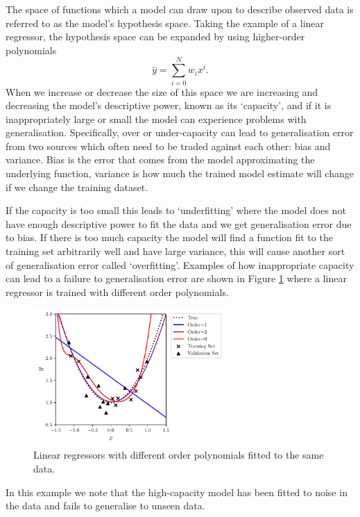 The space of functions which a model can draw upon to describe observed data is referred to as the model's hypothesis space.
Taking the example of a linear regressor, the hypothesis space can be expanded by using higher-order polynomials
\begin{equation}
    \hat{y} = \sum_{i=0}^{N}w_{i}x^{i}.
\end{equation}
When we increase or decrease the size of this space we are increasing and decreasing the model's descriptive power, known as its `capacity', and if it is inappropriately large or small the model can experience problems with generalisation.
Specifically, over or under-capacity can lead to generalisation error from two sources which often need to be traded against each other: bias and variance. Bias is the error that comes from the model approximating the underlying function, variance is how much the trained model estimate will change if we change the training dataset. 

If the capacity is too small this leads to `underfitting' where the model does not have enough descriptive power to fit the data and we get generalisation error due to bias. If there is too much capacity the model will find a function fit to the training set arbitrarily well and have large variance, this will cause another sort of generalisation error called `overfitting'. Examples of how inappropriate capacity can lead to a failure to generalisation error are shown in Figure \ref{fig:machine_learning:overfitting} where a linear regressor is trained with different order polynomials. 
\begin{figure}[h!]
        \includegraphics[width=0.65\textwidth]{figures/machine_learning/capacity.pdf}
    \caption{Linear regressors with different order polynomials fitted to the same data. }
        \label{fig:machine_learning:overfitting}
\end{figure}
In this example we note that the high-capacity model has been fitted to noise in the data and fails to generalise to unseen data. 

